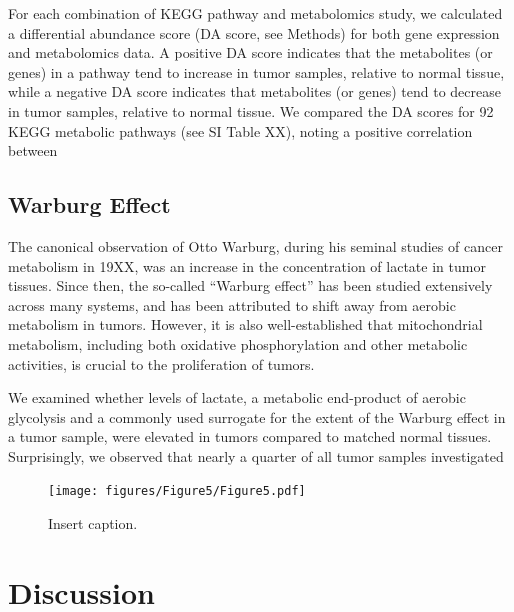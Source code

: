 \documentclass[10pt]{article}
\begin{document}
For each combination of KEGG pathway and metabolomics study, we calculated a differential abundance score (DA score, see Methods) for both gene expression and metabolomics data. A positive DA score indicates that the metabolites (or genes) in a pathway tend to increase in tumor samples, relative to normal tissue, while a negative DA score indicates that metabolites (or genes) tend to decrease in tumor samples, relative to normal tissue. We compared the DA scores for 92 KEGG metabolic pathways (see SI Table XX), noting a positive correlation between 

\subsection{ Warburg Effect }
The canonical observation of Otto Warburg, during his seminal studies of cancer metabolism in 19XX, was an increase in the concentration of lactate in tumor tissues. Since then, the so-called ``Warburg effect'' has been studied extensively across many systems, and has been attributed to shift away from aerobic metabolism in tumors. However, it is also well-established that mitochondrial metabolism, including both oxidative phosphorylation and other metabolic activities, is crucial to the proliferation of tumors.

We examined whether levels of lactate, a metabolic end-product of aerobic glycolysis and a commonly used surrogate for the extent of the Warburg effect in a tumor sample, were elevated in tumors compared to matched normal tissues. Surprisingly, we observed that nearly a quarter of all tumor samples investigated 

\begin{figure}[ht!]
  \centering
     \texttt{[image: figures/Figure5/Figure5.pdf]}
  \caption{Insert caption. }
     \label{fig:Fig5}
\end{figure}

\section{Discussion}
\end{document}
